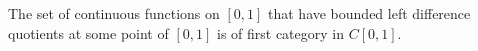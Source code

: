 The set of continuous functions on $[0, 1]$ that have bounded left difference quotients at some point of $[0, 1]$ is of first category in $C[0, 1]$.
